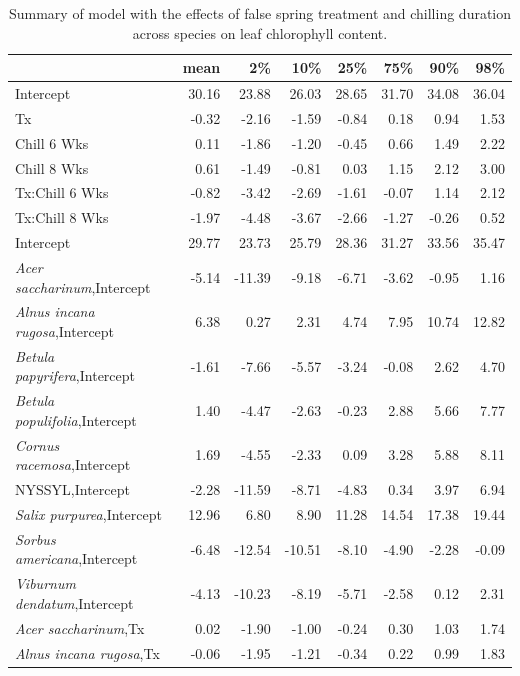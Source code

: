 \documentclass{article}\usepackage[]{graphicx}\usepackage[]{color}
\begin{document}
\newpage
\begin{longtable}{lrrrrrrr}
\caption{Summary of model with the effects of false spring treatment and chilling duration across species on leaf chlorophyll content.} \\ 
  \hline
 & mean & 2\% & 10\% & 25\% & 75\% & 90\% & 98\% \\ 
  \hline \endhead  \hline
Intercept & 30.16 & 23.88 & 26.03 & 28.65 & 31.70 & 34.08 & 36.04 \\ 
  Tx & -0.32 & -2.16 & -1.59 & -0.84 & 0.18 & 0.94 & 1.53 \\ 
  Chill 6 Wks & 0.11 & -1.86 & -1.20 & -0.45 & 0.66 & 1.49 & 2.22 \\ 
  Chill 8 Wks & 0.61 & -1.49 & -0.81 & 0.03 & 1.15 & 2.12 & 3.00 \\ 
  Tx:Chill 6 Wks & -0.82 & -3.42 & -2.69 & -1.61 & -0.07 & 1.14 & 2.12 \\ 
  Tx:Chill 8 Wks & -1.97 & -4.48 & -3.67 & -2.66 & -1.27 & -0.26 & 0.52 \\ 
  Intercept & 29.77 & 23.73 & 25.79 & 28.36 & 31.27 & 33.56 & 35.47 \\ 
  \textit{Acer saccharinum},Intercept & -5.14 & -11.39 & -9.18 & -6.71 & -3.62 & -0.95 & 1.16 \\ 
  \textit{Alnus incana rugosa},Intercept & 6.38 & 0.27 & 2.31 & 4.74 & 7.95 & 10.74 & 12.82 \\ 
  \textit{Betula papyrifera},Intercept & -1.61 & -7.66 & -5.57 & -3.24 & -0.08 & 2.62 & 4.70 \\ 
  \textit{Betula populifolia},Intercept & 1.40 & -4.47 & -2.63 & -0.23 & 2.88 & 5.66 & 7.77 \\ 
  \textit{Cornus racemosa},Intercept & 1.69 & -4.55 & -2.33 & 0.09 & 3.28 & 5.88 & 8.11 \\ 
  NYSSYL,Intercept & -2.28 & -11.59 & -8.71 & -4.83 & 0.34 & 3.97 & 6.94 \\ 
  \textit{Salix purpurea},Intercept & 12.96 & 6.80 & 8.90 & 11.28 & 14.54 & 17.38 & 19.44 \\ 
  \textit{Sorbus americana},Intercept & -6.48 & -12.54 & -10.51 & -8.10 & -4.90 & -2.28 & -0.09 \\ 
  \textit{Viburnum dendatum},Intercept & -4.13 & -10.23 & -8.19 & -5.71 & -2.58 & 0.12 & 2.31 \\ 
  \textit{Acer saccharinum},Tx & 0.02 & -1.90 & -1.00 & -0.24 & 0.30 & 1.03 & 1.74 \\ 
  \textit{Alnus incana rugosa},Tx & -0.06 & -1.95 & -1.21 & -0.34 & 0.22 & 0.99 & 1.83 \\ 

\end{longtable}
\end{document}

